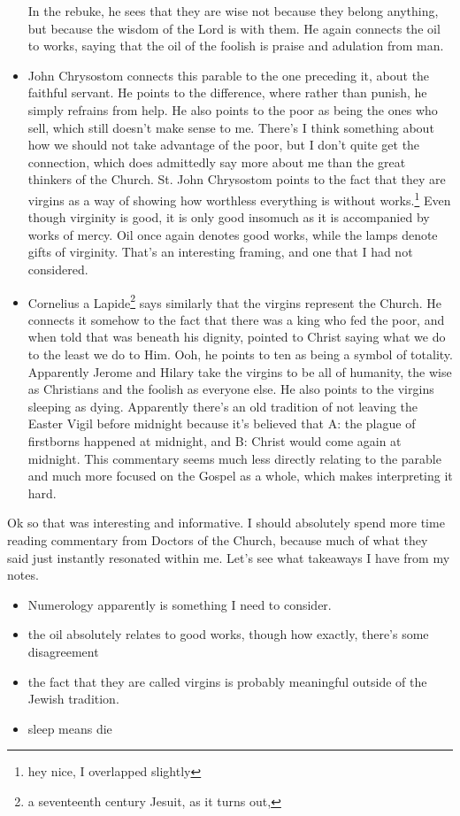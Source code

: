 \documentclass[12pt]{article}[titlepage]
\newcommand{\1}{\={a}}
\newcommand{\2}{\={e}}
\newcommand{\3}{\={\i}}
\newcommand{\4}{\=o}
\newcommand{\5}{\=u}
\newcommand{\6}{\={A}}
\renewcommand{\,}{\textsuperscript{,}}
\begin{document}
\begin{itemize}
In the rebuke, he sees that they are wise not because they belong anything, but because the wisdom of the Lord is with them.
He again connects the oil to works, saying that the oil of the foolish is praise and adulation from man.
\item John Chrysostom connects this parable to the one preceding it, about the faithful servant.
He points to the difference, where rather than punish, he simply refrains from help.
He also points to the poor as being the ones who sell, which still doesn't make sense to me.
There's I think something about how we should not take advantage of the poor, but I don't quite get the connection, which does admittedly say more about me than the great thinkers of the Church.
St. John Chrysostom points to the fact that they are virgins as a way of showing how worthless everything is without works.\footnote{hey nice, I overlapped slightly}
Even though virginity is good, it is only good insomuch as it is accompanied by works of mercy.
Oil once again denotes good works, while the lamps denote gifts of virginity.
That's an interesting framing, and one that I had not considered.
\item Cornelius a Lapide\footnote{a seventeenth century Jesuit, as it turns out,} says similarly that the virgins represent the Church. He connects it somehow to the fact that there was a king who fed the poor, and when told that was beneath his dignity, pointed to Christ saying what we do to the least we do to Him.
Ooh, he points to ten as being a symbol of totality.
Apparently Jerome and Hilary take the virgins to be all of humanity, the wise as Christians and the foolish as everyone else.
He also points to the virgins sleeping as dying.
Apparently there's an old tradition of not leaving the Easter Vigil before midnight because it's believed that A: the plague of firstborns happened at midnight, and B: Christ would come again at midnight.
This commentary seems much less directly relating to the parable and much more focused on the Gospel as a whole, which makes interpreting it hard.
\end{itemize}

Ok so that was interesting and informative.
I should absolutely spend more time reading commentary from Doctors of the Church, because much of what they said just instantly resonated within me.
Let's see what takeaways I have from my notes.

\begin{itemize}
\item Numerology apparently is something I need to consider.
\item the oil absolutely relates to good works, though how exactly, there's some disagreement
\item the fact that they are called virgins is probably meaningful outside of the Jewish tradition.
\item sleep means die
\end{itemize}
\end{document}
